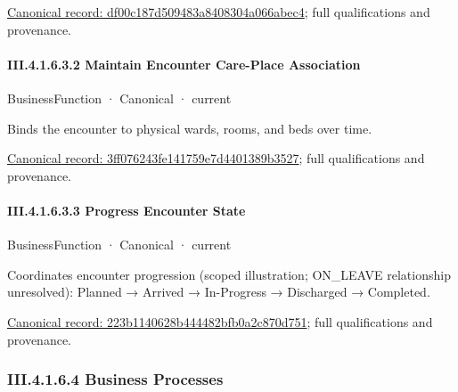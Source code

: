 {\footnotesize \href{../../../../continuum/business/business-function/df00c187d509483a8408304a066abec4.md}{Canonical record: df00c187d509483a8408304a066abec4}; full qualifications and provenance.}\par
\paragraph*{III.4.1.6.3.2 Maintain Encounter Care-Place Association}
\label{navigation:III.4.1.6.3.2}

\label{element:3ff076243fe141759e7d4401389b3527}
{\small BusinessFunction · Canonical · current}\par

Binds the encounter to physical wards, rooms, and beds over time.


{\footnotesize \href{../../../../continuum/business/business-function/3ff076243fe141759e7d4401389b3527.md}{Canonical record: 3ff076243fe141759e7d4401389b3527}; full qualifications and provenance.}\par
\paragraph*{III.4.1.6.3.3 Progress Encounter State}
\label{navigation:III.4.1.6.3.3}

\label{element:223b1140628b444482bfb0a2c870d751}
{\small BusinessFunction · Canonical · current}\par

Coordinates encounter progression (scoped illustration; ON\_LEAVE relationship unresolved): Planned → Arrived → In-Progress → Discharged → Completed.


{\footnotesize \href{../../../../continuum/business/business-function/223b1140628b444482bfb0a2c870d751.md}{Canonical record: 223b1140628b444482bfb0a2c870d751}; full qualifications and provenance.}\par
\subsubsection*{III.4.1.6.4 Business Processes}
\label{navigation:III.4.1.6.4}

